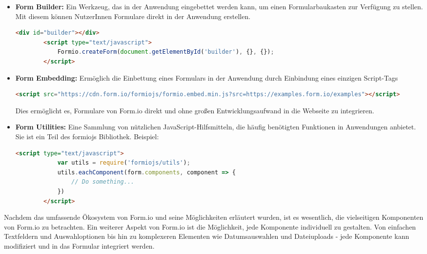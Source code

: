 \begin{itemize}
\begin{adjustwidth}{-5em}{0pt}
\begin{lstlisting}[language=HTML]
                    label: 'Submit'
                }]
            });
        </script>
    \end{lstlisting}
    \end{adjustwidth}
    \item \textbf{Form Builder:} Ein Werkzeug, das in der Anwendung eingebettet werden kann, um einen Formularbaukasten zur Verfügung zu stellen. Mit diesem können NutzerInnen Formulare direkt in der Anwendung erstellen.
    \begin{adjustwidth}{-5em}{0pt}
    \begin{lstlisting}[language=HTML]
        <div id="builder"></div>
        <script type="text/javascript">
            Formio.createForm(document.getElementById('builder'), {}, {});
        </script>
    \end{lstlisting}
    \end{adjustwidth}
    \item \textbf{Form Embedding:} Ermöglich die Einbettung eines Formulars in der Anwendung durch Einbindung eines einzigen Script-Tags
    \begin{adjustwidth}{-5em}{0pt}
    \begin{lstlisting}[language=HTML]
        <script src="https://cdn.form.io/formiojs/formio.embed.min.js?src=https://examples.form.io/examples"></script>
    \end{lstlisting}
    \end{adjustwidth}
    Dies ermöglicht es, Formulare von Form.io direkt und ohne großen Entwicklungsaufwand in die Webseite zu integrieren.
    \item \textbf{Form Utilities:} Eine Sammlung von nützlichen JavaScript-Hilfsmitteln, die häufig benötigten Funktionen in Anwendungen anbietet. Sie ist ein Teil des formiojs Bibliothek. Beispiel:
    \begin{adjustwidth}{-5em}{0pt}
    \begin{lstlisting}[language=HTML]
        <script type="text/javascript">
            var utils = require('formiojs/utils');
            utils.eachComponent(form.components, component => {
                // Do something...
            })
        </script>
    \end{lstlisting}
    \end{adjustwidth}
\end{itemize}

Nachdem das umfassende Ökosystem von Form.io und seine Möglichkeiten erläutert wurden, ist es wesentlich, die vielseitigen Komponenten von Form.io zu betrachten. Ein weiterer Aspekt von Form.io ist die Möglichkeit, jede Komponente individuell zu gestalten. Von einfachen Textfeldern und Auswahloptionen bis hin zu komplexeren Elementen wie Datumsauswahlen und Dateiuploads - jede Komponente kann modifiziert und in das Formular integriert werden.

